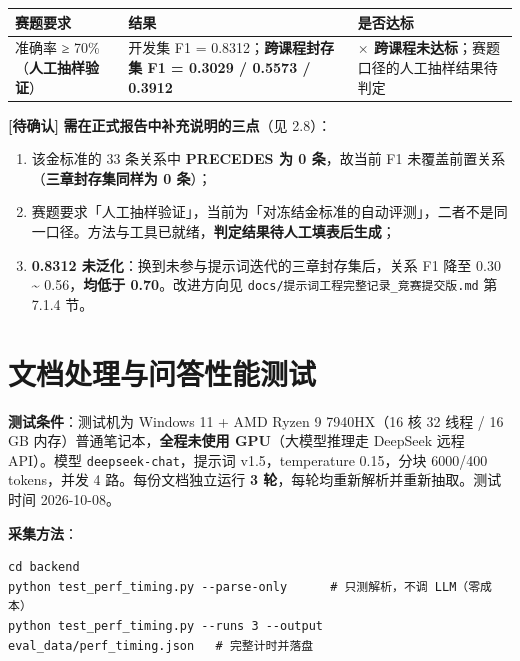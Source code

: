 \documentclass[UTF8,a4paper,11pt]{ctexrep}
\newcommand{\verifymark}{\textcolor{todobar}{\textbf{[待确认]}}}
\begin{document}
\begin{center}
\small
\begin{tabularx}{\linewidth}{@{}XXX@{}}
\toprule
赛题要求 & 结果 & 是否达标 \\
\midrule
准确率 ≥ 70\%（\textbf{人工抽样验证}） & 开发集 F1 = 0.8312；\textbf{跨课程封存集 F1 = 0.3029 / 0.5573 / 0.3912} & \textbf{$\times$ 跨课程未达标}；赛题口径的人工抽样结果待判定 \\
\bottomrule
\end{tabularx}
\end{center}
\begin{todobox}
\verifymark{} \textbf{需在正式报告中补充说明的三点}（见 2.8）：

\begin{enumerate}
\item 该金标准的 33 条关系中 \textbf{PRECEDES 为 0 条}，故当前 F1 未覆盖前置关系（\textbf{三章封存集同样为 0 条}）；
\item 赛题要求「人工抽样验证」，当前为「对冻结金标准的自动评测」，二者不是同一口径。方法与工具已就绪，\textbf{判定结果待人工填表后生成}；
\item \textbf{0.8312 未泛化}：换到未参与提示词迭代的三章封存集后，关系 F1 降至 0.30 \textasciitilde{} 0.56，\textbf{均低于 0.70}。改进方向见 \texttt{docs/提示词工程完整记录\_竞赛提交版.md} 第 7.1.4 节。
\end{enumerate}
\end{todobox}


\section{文档处理与问答性能测试}

\textbf{测试条件}：测试机为 Windows 11 + AMD Ryzen 9 7940HX（16 核 32 线程 / 16 GB 内存）普通笔记本，\textbf{全程未使用 GPU}（大模型推理走 DeepSeek 远程 API）。模型 \texttt{deepseek-chat}，提示词 v1.5，temperature 0.15，分块 6000/400 tokens，并发 4 路。每份文档独立运行 \textbf{3 轮}，每轮均重新解析并重新抽取。测试时间 2026-10-08。

\textbf{采集方法}：

\begin{Verbatim}[breaklines=true,breakanywhere=true,fontsize=\small,frame=single,framesep=4pt,rulecolor=\color{codeframe}]
cd backend
python test_perf_timing.py --parse-only      # 只测解析，不调 LLM（零成本）
python test_perf_timing.py --runs 3 --output eval_data/perf_timing.json   # 完整计时并落盘
\end{Verbatim}
\end{document}
